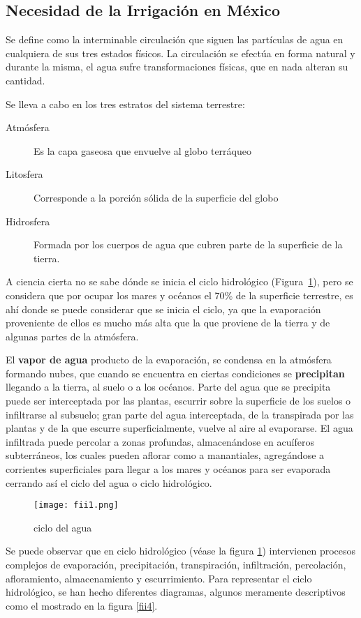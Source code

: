 \subsection{Necesidad de la Irrigación en México}
\begin{definition}
	Se define como la interminable circulación que siguen las partículas de agua en cualquiera de sus tres estados físicos. La circulación se efectúa en forma natural y durante la misma, el agua sufre transformaciones físicas, que en nada alteran su cantidad.
\end{definition}
Se lleva a cabo en los tres estratos del sistema terrestre:
\begin{description}
	\item[Atmósfera] Es la capa gaseosa que envuelve al globo terráqueo
	\item[Litosfera] Corresponde a la porción sólida de la superficie del globo
	\item[Hidrosfera] Formada por los cuerpos de agua que cubren parte de la superficie de la tierra.
\end{description}
A ciencia cierta no se sabe dónde se inicia el ciclo hidrológico (Figura~\ref{fii1}), pero se considera que por ocupar los mares y océanos el 70\% de la superficie terrestre, es ahí donde se puede considerar que se inicia el ciclo, ya que la evaporación proveniente de ellos es mucho más alta que la que proviene de la tierra y de algunas partes de la atmósfera.

El \textbf{vapor de agua} producto de la evaporación, se condensa en la atmósfera formando nubes, que cuando se encuentra en ciertas condiciones se \textbf{precipitan} llegando a la tierra, al suelo o a los océanos. Parte del agua que se precipita puede ser interceptada por las plantas, escurrir sobre la superficie de los suelos o infiltrarse al subsuelo; gran parte del agua interceptada, de la transpirada por las plantas y de la que escurre superficialmente, vuelve al aire al evaporarse. El agua infiltrada puede percolar a zonas profundas, almacenándose en acuíferos subterráneos, los cuales pueden aflorar como a manantiales, agregándose a corrientes superficiales para llegar a los mares y océanos
para ser evaporada cerrando así el ciclo del agua o ciclo hidrológico.\begin{figure}[h!]
	\centerline{\texttt{[image: fii1.png]}}
	\caption{ciclo del agua}
	\label{fii1}
\end{figure}
Se puede observar que en ciclo hidrológico (véase la figura \ref{fii1}) intervienen procesos complejos de evaporación, precipitación, transpiración, infiltración, percolación, afloramiento, almacenamiento y escurrimiento. Para representar el ciclo hidrológico, se han hecho diferentes diagramas, algunos meramente descriptivos como el mostrado en la figura \ref{fii4}.
